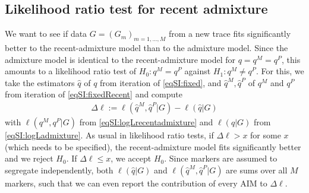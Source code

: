 \documentclass[12pt]{article}
\theoremstyle{definition}
\begin{document}
\subsection{Likelihood ratio {\color{blue}test} for recent admixture}
\label{ss:LR}
We want to see if data $G = (G_m)_{m=1,...,M}$ from a new trace fits significantly better to the recent-admixture model than to the admixture model. Since the admixture model is identical to the recent-admixture model for $q = q^M = q^P$, this amounts to a likelihood ratio test of $H_0: q^M = q^P$ against $H_1: q^M\neq q^P$. For this, we take the estimators $\hat q$ of $q$ from iteration of \eqref{eqSI:fixed}, and $\hat q^M, \hat q^P$ of $q^M$ and $q^P$ from iteration of \eqref{eqSI:fixedRecent} and compute
\begin{align}
  \label{eq:DeltaEll}
  \Delta\ell := \ell(\hat q^M, \hat q^P|G) - \ell(\hat q|G)
\end{align}
with $\ell(q^M, q^P|G)$ from \eqref{eqSI:logLrecentadmixture} and $\ell(q|G)$ from \eqref{eqSI:logLadmixture}. As usual in
likelihood ratio tests, if $\Delta \ell >x$ for some $x$ (which needs to be specified), the recent-admixture model fits significantly better and we reject $H_0$. If $\Delta \ell \leq x$, we accept $H_0$. Since markers are assumed to segregate independently, both $\ell(\hat q|G)$ and $\ell(\hat q^M, \hat q^P|G)$ are sums over all $M$ markers, such that we can even report the contribution of every AIM to $\Delta\ell$. 
\end{document}
